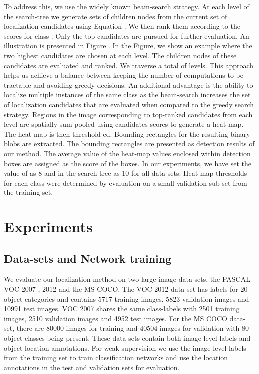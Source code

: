 \documentclass[runningheads]{llncs}
\begin{document}
To address this, we use the widely known beam-search \cite{rubin1977locus} strategy. At each level of the search-tree we generate sets of children nodes from the current set of localization candidates using Equation . We then rank them according to the scores for class . Only the top  candidates are pursued for further evaluation. An illustration is presented in Figure . In the Figure, we show an example where the two highest candidates are chosen at each level. The children nodes of these candidates are evaluated and ranked. We traverse a total of  levels.  This approach helps us achieve a balance between keeping the number of computations to be tractable and avoiding greedy decisions. An additional advantage is the ability to localize multiple instances of the same class as the beam-search increases the set of localization candidates that are evaluated when compared to the greedy search strategy. Regions in the image corresponding to top-ranked candidates from each level are spatially sum-pooled using candidates scores to generate a heat-map. The heat-map is then threshold-ed. Bounding rectangles for the resulting binary blobs are extracted. The bounding rectangles are presented as detection results of our method. The average value of the heat-map values enclosed within detection boxes are assigned as the score of the boxes.
In our experiments, we have set the value of  as 8 and  in the search tree as 10 for all data-sets. Heat-map thresholds for each class were determined by evaluation on a small validation sub-set from the training set.



\section{Experiments}\label{section:Expertiments}

\subsection{Data-sets and Network training}
We evaluate our localization method on two large image data-sets, the PASCAL VOC 2007 \cite{pascal-voc-2007}, 2012 and the MS COCO. The VOC 2012 data-set has labels for 20 object categories and contains 5717 training images, 5823 validation images and 10991 test images. VOC 2007 shares the same class-labels with 2501 training images, 2510 validation images and 4952 test images. For the MS COCO data-set, there are 80000 images for training and 40504 images for validation with 80 object classes being present. These data-sets contain both image-level labels and object location annotations. For weak supervision we use the image-level labels from the training set to train classification networks and use the location annotations in the test and validation sets for evaluation.
\end{document}

